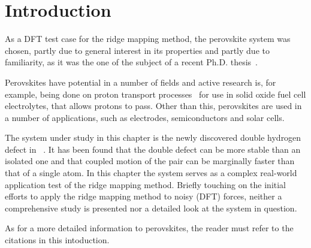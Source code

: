 \section{Introduction}
\label{sec:perovskites-introduction}

As a DFT test case for the ridge mapping method, the  perovskite system was chosen, partly due to general interest in its properties and partly due to familiarity, as it was the one of the subject of a recent Ph.D. thesis~\cite{nicolai-2010}.

Perovskites have potential in a number of fields and active research is, for example, being done on proton transport processes~\cite{perovskites-hydrogen-diffusion-2007, perovskites-proton-transport-2008} for use in solid oxide fuel cell electrolytes, that allows protons to pass\cite{perovskites-in-fuel-cells-1981}.
Other than this, perovskites are used in a number of applications, such as electrodes, semiconductors and solar cells.

The system under study in this chapter is the newly discovered double hydrogen defect in ~\cite{double-defect-2011}.
It has been found that the double defect can be more stable than an isolated one and that coupled motion of the pair can be marginally faster than that of a single atom.
In this chapter the system serves as a complex real-world application test of the ridge mapping method.
Briefly touching on the initial efforts to apply the ridge mapping method to noisy (DFT) forces, neither a comprehensive study is presented nor a detailed look at the system in question.

As for a more detailed information to perovskites, the reader must refer to the citations in this intoduction.





\vspace*{\fill}
